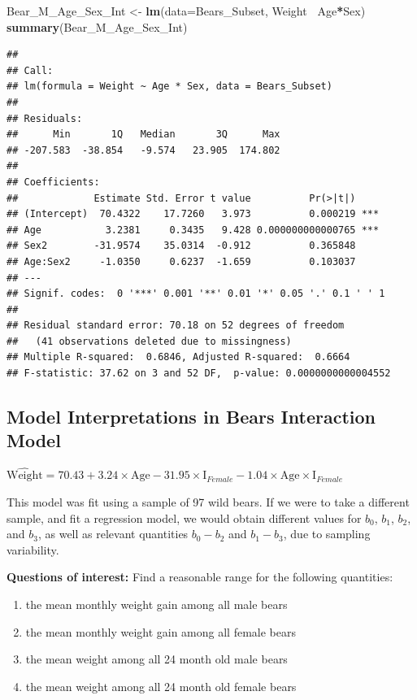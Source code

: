 \documentclass[]{book}
\newenvironment{Shaded}{\begin{snugshade}}{\end{snugshade}}
\newcommand{\KeywordTok}[1]{\textcolor[rgb]{0.13,0.29,0.53}{\textbf{#1}}}
\newcommand{\DataTypeTok}[1]{\textcolor[rgb]{0.13,0.29,0.53}{#1}}
\newcommand{\StringTok}[1]{\textcolor[rgb]{0.31,0.60,0.02}{#1}}
\newcommand{\OperatorTok}[1]{\textcolor[rgb]{0.81,0.36,0.00}{\textbf{#1}}}
\newcommand{\NormalTok}[1]{#1}
\providecommand{\tightlist}{%
  \setlength{\itemsep}{0pt}\setlength{\parskip}{0pt}}
\begin{document}
\begin{Shaded}
\begin{Highlighting}[]
\NormalTok{Bear_M_Age_Sex_Int <-}\StringTok{ }\KeywordTok{lm}\NormalTok{(}\DataTypeTok{data=}\NormalTok{Bears_Subset, Weight}\OperatorTok{~}\StringTok{ }\NormalTok{Age}\OperatorTok{*}\NormalTok{Sex)}
\KeywordTok{summary}\NormalTok{(Bear_M_Age_Sex_Int)}
\end{Highlighting}
\end{Shaded}

\begin{verbatim}
## 
## Call:
## lm(formula = Weight ~ Age * Sex, data = Bears_Subset)
## 
## Residuals:
##      Min       1Q   Median       3Q      Max 
## -207.583  -38.854   -9.574   23.905  174.802 
## 
## Coefficients:
##             Estimate Std. Error t value          Pr(>|t|)    
## (Intercept)  70.4322    17.7260   3.973          0.000219 ***
## Age           3.2381     0.3435   9.428 0.000000000000765 ***
## Sex2        -31.9574    35.0314  -0.912          0.365848    
## Age:Sex2     -1.0350     0.6237  -1.659          0.103037    
## ---
## Signif. codes:  0 '***' 0.001 '**' 0.01 '*' 0.05 '.' 0.1 ' ' 1
## 
## Residual standard error: 70.18 on 52 degrees of freedom
##   (41 observations deleted due to missingness)
## Multiple R-squared:  0.6846, Adjusted R-squared:  0.6664 
## F-statistic: 37.62 on 3 and 52 DF,  p-value: 0.0000000000004552
\end{verbatim}

\subsection{Model Interpretations in Bears Interaction
Model}\label{model-interpretations-in-bears-interaction-model}

\(\widehat{\text{Weight}}= 70.43+ 3.24 \times\text{Age}- 31.95\times\text{I}_{Female} -1.04\times\text{Age}\times\text{I}_{Female}\)

This model was fit using a sample of 97 wild bears. If we were to take a
different sample, and fit a regression model, we would obtain different
values for \(b_0\), \(b_1\), \(b_2\), and \(b_3\), as well as relevant
quantities \(b_0-b_2\) and \(b_1-b_3\), due to sampling variability.

\textbf{Questions of interest:} Find a reasonable range for the
following quantities:

\begin{enumerate}
\def\labelenumi{\arabic{enumi}.}
\tightlist
\item
  the mean monthly weight gain among all male bears\\
\item
  the mean monthly weight gain among all female bears\\
\item
  the mean weight among all 24 month old male bears\\
\item
  the mean weight among all 24 month old female bears
\end{enumerate}
\end{document}
